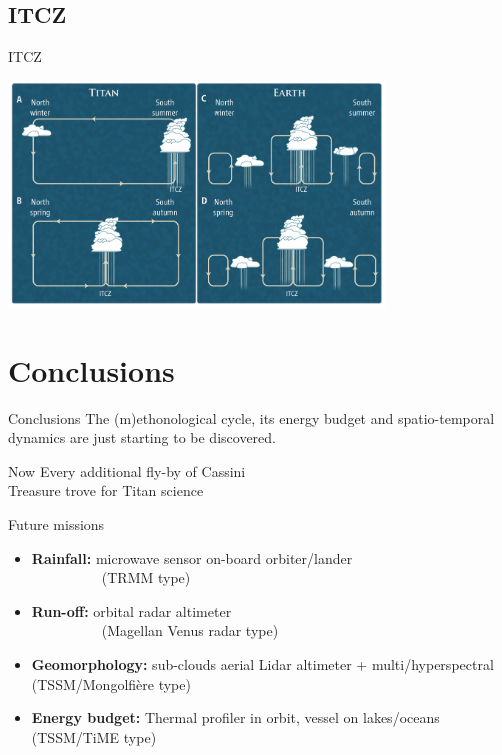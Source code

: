 \documentclass[xcolor=dvipsnames,beamer]{beamer} %
\begin{document}
\subsection{ITCZ}
\begin{frame}[fragile]{ITCZ}

\begin{center}
  \includegraphics[width=10cm]{images/TokanoPerspectiveFigure}
\end{center}
\end{frame}
\section{Conclusions}
\begin{frame}[fragile]{Conclusions}
The (m)ethonological cycle, its energy budget and spatio-temporal dynamics are just starting to be discovered.
\begin{block}{Now}
Every additional fly-by of Cassini\\
Treasure trove for Titan science
\end{block}
\begin{block}{Future missions}
\begin{itemize}
 \item {\bf Rainfall:} microwave sensor on-board orbiter/lander \\~~~~~~~~~~(TRMM type)
 \item {\bf Run-off:} orbital radar altimeter \\~~~~~~~~~~(Magellan Venus radar type)
 \item {\bf Geomorphology:} sub-clouds aerial Lidar altimeter + multi/hyperspectral (TSSM/Mongolfi\`ere type)
 \item {\bf Energy budget:} Thermal profiler in orbit, vessel on lakes/oceans (TSSM/TiME type)
\end{itemize}
\end{block}
\end{frame}
\end{document}
